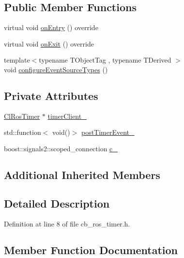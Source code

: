 \subsection*{Public Member Functions}
\begin{DoxyCompactItemize}
\item 
virtual void \hyperlink{classros__timer__client_1_1CbTimer_a25c086b5988642602938d92f9555ce18}{on\+Entry} () override
\item 
virtual void \hyperlink{classros__timer__client_1_1CbTimer_a27d62ebacf667d4c2518c0416ee7b25b}{on\+Exit} () override
\item 
{\footnotesize template$<$typename T\+Object\+Tag , typename T\+Derived $>$ }\\void \hyperlink{classros__timer__client_1_1CbTimer_a11226b0050d363187aa1bfe3e9c672af}{configure\+Event\+Source\+Types} ()
\end{DoxyCompactItemize}
\subsection*{Private Attributes}
\begin{DoxyCompactItemize}
\item 
\hyperlink{classros__timer__client_1_1ClRosTimer}{Cl\+Ros\+Timer} $\ast$ \hyperlink{classros__timer__client_1_1CbTimer_a370d115a7423db45ca375673db8a4ed1}{timer\+Client\+\_\+}
\item 
std\+::function$<$ void()$>$ \hyperlink{classros__timer__client_1_1CbTimer_a7e15bf1451d17c96aba814dc3e5c08e9}{post\+Timer\+Event\+\_\+}
\item 
boost\+::signals2\+::scoped\+\_\+connection \hyperlink{classros__timer__client_1_1CbTimer_a755a7f5d8662ae3b7507da0fe82e5b22}{c\+\_\+}
\end{DoxyCompactItemize}
\subsection*{Additional Inherited Members}


\subsection{Detailed Description}


Definition at line 8 of file cb\+\_\+ros\+\_\+timer.\+h.



\subsection{Member Function Documentation}
